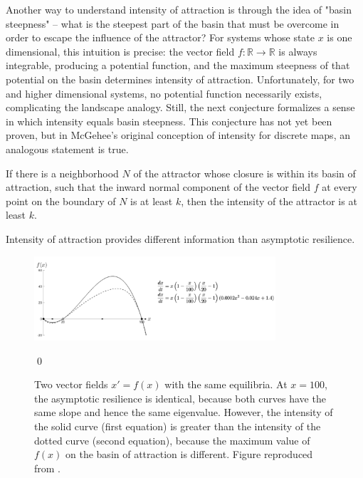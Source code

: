 Another way to understand intensity of attraction is through the idea of "basin steepness" -- what is the steepest part of the basin that must be overcome in order to escape the influence of the attractor? For systems whose state $x$ is one dimensional, this intuition is precise: the vector field $f: \mathbb{R} \to \mathbb{R}$ is always integrable, producing a potential function, and the maximum steepness of that potential on the basin determines intensity of attraction.
%
%
%
%
Unfortunately, for two and higher dimensional systems, no potential function necessarily exists, complicating the landscape analogy. Still, the next conjecture formalizes a sense in which intensity equals basin steepness. This conjecture has not yet been proven, but in McGehee's original conception of intensity for discrete maps, an analogous statement is true. %

\begin{conjecture}
	\label{conj:steepness}
	If there is a neighborhood $N$ of the attractor whose closure is within its basin of attraction, such that the inward normal component of the vector field $f$ at every point on the boundary of $N$ is at least $k$, then the intensity of the attractor is at least $k$.
\end{conjecture}


\begin{example} Intensity of attraction provides different information than asymptotic resilience. 
	\begin{figure}[H]
		\centering
		\captionsetup{width=0.9\linewidth}
		\includegraphics[width=0.8\textwidth]{figs/intensity_vs_eigenvalue} 
		\caption{Two vector fields $x'=f(x)$ with the same equilibria. At $x=100$, the asymptotic resilience is identical, because both curves have the same slope and hence the same eigenvalue. However, the intensity of the solid curve (first equation) is greater than the intensity of the dotted curve (second equation), because the maximum value of $f(x)$ on the basin of attraction is different. Figure reproduced from \cite{meyerMetricPropertiesAttractors2019}.}\qed
		\label{fig:intensity_vs_eigenvalue}
	\end{figure}
\end{example}